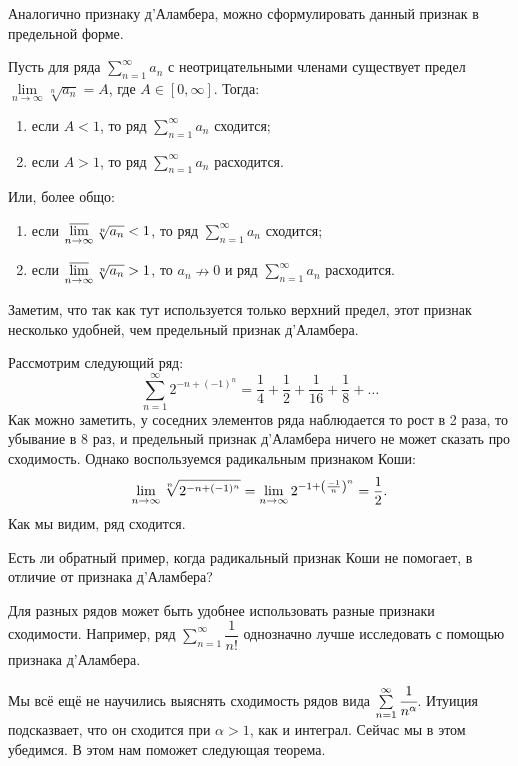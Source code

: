 \documentclass[a4paper, 12pt]{article}
\begin{document}
Аналогично признаку д'Аламбера, можно сформулировать данный признак в предельной форме.
\begin{Consequence}
	Пусть для ряда	 $\sum\limits_{n=1}^{\infty} a_n$ с неотрицательными членами существует предел $\lim\limits_{n\rightarrow\infty} \sqrt[n]{a_n} = A$, где $A \in [0, \infty]$. Тогда:
	\begin{enumerate}
		\item если $A < 1$, то ряд $\sum\limits_{n=1}^{\infty} a_n$ сходится;
		\item если $A > 1$, то ряд $\sum\limits_{n=1}^{\infty} a_n$ расходится.
	\end{enumerate}
	Или, более общо:
	\begin{enumerate}
	\item если $\varlimsup\limits_{n\rightarrow \infty} \sqrt[n]{a_n} < 1$, то ряд $\sum\limits_{n=1}^{\infty} a_n$ сходится;
	\item если $\varlimsup\limits_{n\rightarrow \infty} \sqrt[n]{a_n} > 1$, то $a_n \nrightarrow 0$ и ряд $\sum\limits_{n=1}^{\infty} a_n$ расходится.
	\end{enumerate}
\end{Consequence}
Заметим, что так как тут используется только верхний предел, этот признак несколько удобней, чем предельный признак д'Аламбера.

\begin{Examples}
Рассмотрим следующий ряд:
$$
\sum\limits_{n=1}^{\infty} 2^{-n+(-1)^n} = \frac{1}{4} + \frac{1}{2} + \frac{1}{16} + \frac{1}{8} + \ldots 
$$
Как можно заметить, у соседних элементов ряда наблюдается то рост в 2 раза, то убывание в 8 раз, и предельный признак д'Аламбера ничего не может сказать про сходимость. Однако воспользуемся радикальным признаком Коши:
$$
\lim_{n\rightarrow \infty} \sqrt[n]{2^{-n + (-1)^n}} = \lim_{n\rightarrow \infty} 2^{-1 + \left(\frac{-1}{n}\right)^n} = \frac{1}{2}.
$$
Как мы видим, ряд сходится.
\end{Examples}

\begin{Task}
Есть ли обратный пример, когда радикальный признак Коши не помогает, в отличие от признака д'Аламбера?
\end{Task}

Для разных рядов может быть удобнее использовать разные признаки сходимости. Например, ряд $\sum\limits_{n=1}^{\infty} \dfrac{1}{n!}$ однозначно лучше исследовать с помощью признака д'Аламбера.

Мы всё ещё не научились выяснять сходимость рядов вида $\sum\limits_{n = 1}^{\infty}\cfrac{1}{n^\alpha}$. Итуиция подсказвает, что он сходится при $\alpha > 1$, как и интеграл. Сейчас мы в этом убедимся. В этом нам поможет следующая теорема.
\end{document}
